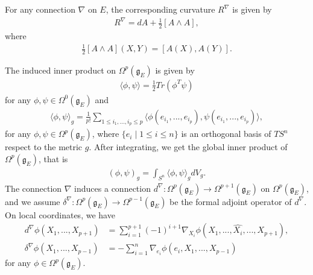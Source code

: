 \documentclass{amsart}
\begin{document}
	For any connection $\nabla$ on $E$, the corresponding curvature $R^\nabla$ is given by
	\begin{align*}
		R^\nabla=dA+\frac12[A\wedge A],
	\end{align*}
	where
	\begin{align*}
		\frac12[A\wedge A](X,Y)=[A(X),A(Y)].
	\end{align*}
	
	The induced inner product on $\Omega^p(\mathfrak{g}_E)$ is given by
	\begin{align*}
		\langle\phi,\psi\rangle=\frac12Tr(\phi^T\psi)
	\end{align*}
	for any $\phi,\psi\in\Omega^0(\mathfrak{g}_E)$ and
	\begin{align*}
		\langle\phi,\psi\rangle_g=\frac1{p!}\sum_{1\le i_1,...,i_p\le p}\langle\phi(e_{i_1},...,e_{i_p}),\psi(e_{i_1},...,e_{i_p})\rangle,
	\end{align*}
	for any $\phi,\psi\in\Omega^p(\mathfrak{g}_E)$, where $\{e_i\mid1\le i\le n\}$ is an orthogonal basis of $TS^n$ respect to the metric $g$. After integrating, we get the global inner product of $\Omega^p(\mathfrak{g}_E)$, that is
	\begin{align*}
		(\phi,\psi)_g=\int_{S^n}\langle\phi,\psi\rangle_g dV_g.
	\end{align*}
	The connection $\nabla$ induces a connection $d^\nabla:\Omega^p(\mathfrak{g}_E)\to\Omega^{p+1}(\mathfrak{g}_E)$ on $\Omega^p(\mathfrak{g}_E)$, and we assume $\delta^\nabla:\Omega^p(\mathfrak{g}_E)\to\Omega^{p-1}(\mathfrak{g}_E)$ be the formal adjoint operator of $d^\nabla$. On local coordinates, we have
	\begin{align*}
		d^\nabla\phi(X_1,...,X_{p+1})&=\sum_{i=1}^{p+1}(-1)^{i+1}\nabla_{X_i}\phi(X_1,...,\hat{X_i},...,X_{p+1}),\\
		\delta^\nabla\phi(X_1,...,X_{p-1})&=-\sum_{i=1}^n\nabla_{e_i}\phi(e_i,X_1,...,X_{p-1})
	\end{align*}
	for any $\phi\in\Omega^p(\mathfrak{g}_E)$. 
	
\end{document}
